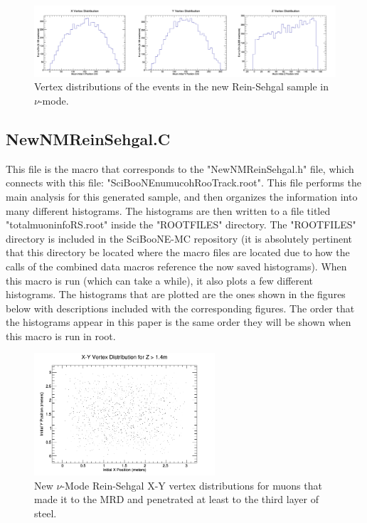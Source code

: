 \documentclass[11pt]{article}
\begin{document}
\begin{figure}[H]
\centering
\includegraphics[width=1.0\textwidth]{EventClassifications/VertexDistributions.png}
\caption{Vertex distributions of the events in the new Rein-Sehgal sample in $\nu$-mode.}
\end{figure}





\subsection{NewNMReinSehgal.C}
This file is the macro that corresponds to the "NewNMReinSehgal.h" file, which connects with this file: "SciBooNE\textunderscore numu\textunderscore coh\textunderscore RooTrack.root". This file performs the main analysis for this generated sample, and then organizes the information into many different histograms. The histograms are then written to a file titled "totalmuoninfoRS.root" inside the "ROOTFILES" directory. The "ROOTFILES" directory is included in the SciBooNE-MC repository (it is absolutely pertinent that this directory be located where the macro files are located due to how the calls of the combined data macros reference the now saved histograms). When this macro is run (which can take a while), it also plots a few different histograms. The histograms that are plotted are the ones shown in the figures below with descriptions included with the corresponding figures. The order that the histograms appear in this paper is the same order they will be shown when this macro is run in root.

\begin{figure}[H]
\centering
\includegraphics[width=0.6\textwidth]{NewNMReinSehgalImages/1-X-YVertexDistributionNMRS.png}
\caption{New $\nu$-Mode Rein-Sehgal X-Y vertex distributions for muons that made it to the MRD and penetrated at least to the third layer of steel.}
\end{figure}
\end{document}
